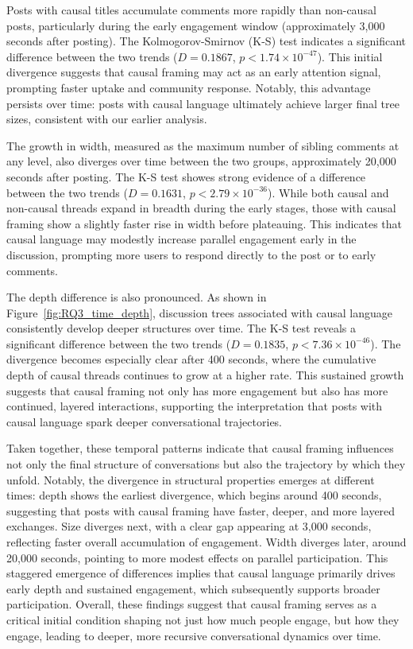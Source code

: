 \documentclass[acmsmall]{acmart}
\begin{document}
Posts with causal titles accumulate comments more rapidly than non-causal posts, particularly during the early engagement window (approximately 3,000 seconds after posting). The Kolmogorov-Smirnov (K-S) test indicates a significant difference between the two trends ($D = 0.1867$, $p < 1.74 \times 10^{-47}$). This initial divergence suggests that causal framing may act as an early attention signal, prompting faster uptake and community response. Notably, this advantage persists over time: posts with causal language ultimately achieve larger final tree sizes, consistent with our earlier  analysis.

The growth in width, measured as the maximum number of sibling comments at any level, also diverges over time between the two groups, approximately 20,000 seconds after posting. The K-S test showes strong evidence of a difference between the two trends
($D = 0.1631$, $p < 2.79 \times 10^{-36}$). While both causal and non-causal threads expand in breadth during the early stages, those with causal framing show a slightly faster rise in width before plateauing. This indicates that causal language may modestly increase parallel engagement early in the discussion, prompting more users to respond directly to the post or to early comments.

The depth difference is also pronounced. As shown in Figure~\ref{fig:RQ3_time_depth}, discussion trees associated with causal language consistently develop deeper structures over time. The K-S test reveals a significant difference between the two trends ($D = 0.1835$, $p < 7.36 \times 10^{-46}$). The divergence becomes especially clear after 400 seconds, where the cumulative depth of causal threads continues to grow at a higher rate. This sustained growth suggests that causal framing not only has more engagement but also has more continued, layered interactions, supporting the interpretation that posts with causal language spark deeper conversational trajectories.


Taken together, these temporal patterns indicate that causal framing influences not only the final structure of conversations but also the trajectory by which they unfold. Notably, the divergence in structural properties emerges at different times: depth shows the earliest divergence, which begins around 400 seconds, suggesting that posts with causal framing have faster, deeper, and more layered exchanges. Size diverges next, with a clear gap appearing at 3,000 seconds, reflecting faster overall accumulation of engagement. Width diverges later, around 20,000 seconds, pointing to more modest effects on parallel participation. This staggered emergence of differences implies that causal language primarily drives early depth and sustained engagement, which subsequently supports broader participation. Overall, these findings suggest that causal framing serves as a critical initial condition shaping not just how much people engage, but how they engage, leading to deeper, more recursive conversational dynamics over time.
\end{document}
